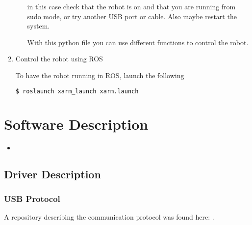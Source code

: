 \documentclass[letterpaper,10pt,english]{sphinxmanual}
\begin{document}
\begin{enumerate}
\begin{itemize}
\begin{figure}[htbp]
\noindent{}
\end{figure}

\sphinxAtStartPar
in this case check that the robot is on and that you are running from sudo mode, or try another USB port or cable. Also maybe restart the system.

\sphinxAtStartPar
With this python file you can use different functions to control the robot.

\end{itemize}

\item {} 
\sphinxAtStartPar
Control the robot using ROS

\sphinxAtStartPar
To have the robot running in ROS, launch the following



\begin{Verbatim}[commandchars=\\\{\}]
$ roslaunch xarm_launch xarm.launch
\end{Verbatim}

\end{enumerate}


\chapter{Software Description}
\label{\detokenize{index:software-description}}\begin{itemize}
\item {} 
\sphinxAtStartPar
{\hyperref[\detokenize{user_guide/1_2_software_description::doc}]{}}

\end{itemize}

\sphinxstepscope


\section{Driver Description}
\label{\detokenize{user_guide/1_2_software_description:driver-description}}\label{\detokenize{user_guide/1_2_software_description::doc}}

\subsection{USB Protocol}
\label{\detokenize{user_guide/1_2_software_description:usb-protocol}}
\sphinxAtStartPar
A repository describing the communication protocol was found here: .
\end{document}
